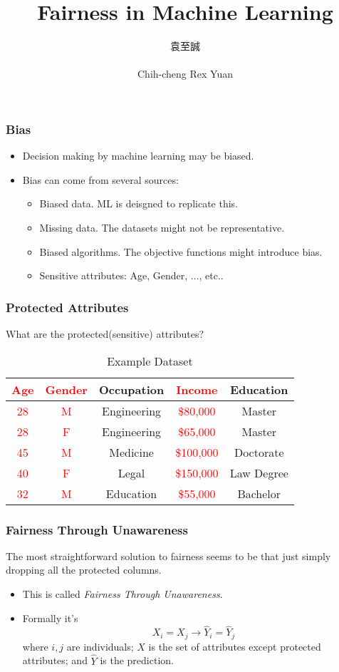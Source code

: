 \documentclass{beamer}
\date{\displaydate{date}}
\title[Fairness]{Fairness in Machine Learning}
\author[Rex]{\begin{CJK}{UTF8}{bsmi}袁至誠\end{CJK}\\Chih-cheng Rex Yuan}
\institute[IIS]{Institute of Information Science}
\renewcommand{\implies}{\rightarrow}
\newcommand{\red}[1]{\textcolor{red}{#1}}
\begin{document}
\begin{frame}
\titlepage
\end{frame}

\begin{frame}
    \frametitle{Bias}
    \begin{itemize}
        \item Decision making by machine learning may be biased.
        \item Bias can come from several sources:
        \begin{itemize}
            \item Biased data. ML is deisgned to replicate this.
            \item Missing data. The datasets might not be representative.
            \item Biased algorithms. The objective functions might introduce bias.
            \item Sensitive attributes: Age, Gender, ..., etc..
        \end{itemize}
    \end{itemize}
\end{frame}

\begin{frame}
    \frametitle{Protected Attributes}
    What are the protected(sensitive) attributes?
    \begin{table}
        \begin{tabular}{|c|c|c|c|c|}
            \hline
            \red{Age} & \red{Gender} & Occupation & \red{Income} & Education \\
            \hline
            \red{28} & \red{M} & Engineering & \red{\$80,000} & Master \\
            \red{28} & \red{F} & Engineering & \red{\$65,000} & Master \\
            \red{45} & \red{M} & Medicine    & \red{\$100,000} & Doctorate \\
            \red{40} & \red{F} & Legal       & \red{\$150,000} & Law Degree \\
            \red{32} & \red{M} & Education   & \red{\$55,000} & Bachelor \\
            \hline
        \end{tabular}
        \caption{Example Dataset}
    \end{table}
\end{frame}

\begin{frame}
    \frametitle{Fairness Through Unawareness}
    The most straightforward solution to fairness seems to be that
    just simply dropping all the protected columns.
    \begin{itemize}
        \item This is called \textit{Fairness Through Unawareness}.
        \item Formally it's
        \[
            X_i = X_j \implies \hat{Y}_i = \hat{Y}_j
        \]
        where $i,j$ are individuals; $X$ is the set of attributes
        except protected attributes; and $\hat{Y}$ is the prediction.
    \end{itemize}
\end{frame}
\end{document}
